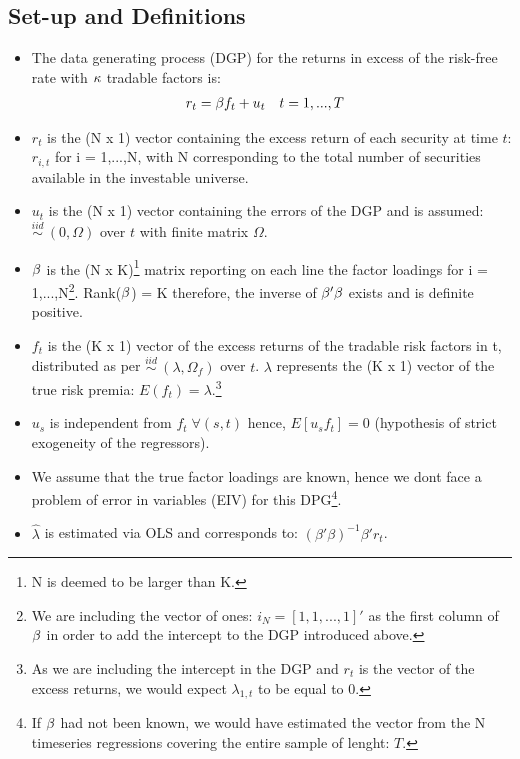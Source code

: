 \documentclass[12pt]{article}
\begin{document}
	\subsection{Set-up and Definitions}
	\begin{itemize}
		\item The data generating process (DGP) for the returns in excess of the risk-free rate with $\MakeUppercase\kappa$ tradable factors is: 
			\begin{align} \label{cross-sectional}
				r_{t} &= \MakeUppercase\beta f_t + u_t \quad t = 1,...,T 
			\end{align} \vspace{-1.75em} 
			\item $r_t$ is the (N x 1) vector containing the excess return of each security at time $t$: $r_{i,t}$ for i = 1,...,N, with N corresponding to the total number of securities available in the investable universe.   
			\item $u_t$ is the (N x 1) vector containing the errors of the DGP and is assumed: $\overset{iid}{\sim} \: (0,\Omega)$ over $t$ with finite matrix $\Omega$. 
			\item $\MakeUppercase\beta$ is the (N x K)\footnote{N is deemed to be larger than K.} matrix reporting on each line the factor loadings for i = 1,...,N\footnote{We are including the vector of ones: $i_N = [1,1,...,1]'$ as the first column of $\MakeUppercase\beta$ in order to add the intercept to the DGP introduced above.}.
			\subitem Rank($\MakeUppercase\beta$) = K therefore, the inverse of $\MakeUppercase\beta'\MakeUppercase\beta$ exists and is definite positive. 
			\item $f_t$ is the (K x 1) vector of the excess returns of the tradable risk factors in t, distributed as per $\overset{iid}{\sim} \: (\lambda,\Omega_{f})$ over $t$. $\lambda$ represents the (K x 1) vector of the true risk premia: $E(f_t) = \lambda$.\footnote{As we are including the intercept in the DGP and $r_{t}$ is the vector of the excess returns, we would expect $\lambda_{1,t}$ to be equal to 0.}
			\item $u_s$ is independent from $f_t \; \forall(s,t)$ hence, $E[u_{s}f_t] = 0$ (hypothesis of strict exogeneity of the regressors).
			\item We assume that the true factor loadings are known, hence we dont face a problem of error in variables (EIV) for this DPG\footnote{If $\MakeUppercase\beta$ had not been known, we would have estimated the vector from the N timeseries regressions covering the entire sample of lenght: $T$.}.
			\item $\hat{\lambda}$ is estimated via OLS and corresponds to: $(\beta'\beta)^{-1}\beta'r_t$.
			\end{itemize}
\end{document}

